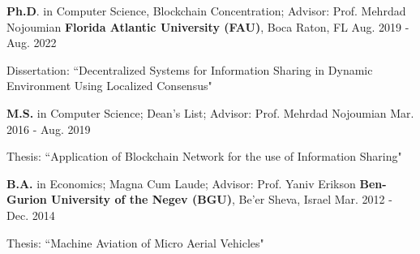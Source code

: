 


\begin{cventries}


\cventry
{\textbf{Ph.D}. in Computer Science, Blockchain Concentration; Advisor: Prof. Mehrdad Nojoumian} %
{\textbf{Florida Atlantic University (FAU)}, Boca Raton, FL} %
{} %
{Aug. 2019 - Aug. 2022} %
{ %
	\begin{cvitems}
		\item {Dissertation: ``Decentralized Systems for Information Sharing in Dynamic Environment Using Localized Consensus"}
	\end{cvitems}
}

\cventry
{\textbf{M.S.} in Computer Science; Dean's List; Advisor: Prof. Mehrdad Nojoumian} %
{} %
{} %
{Mar. 2016 - Aug. 2019} %
{ %
	\begin{cvitems}
		\item {Thesis: ``Application of Blockchain Network for the use of Information Sharing"}
	\end{cvitems}
}


\cventry
{\textbf{B.A.} in Economics; Magna Cum Laude; Advisor: Prof. Yaniv Erikson} %
{\textbf{Ben-Gurion University of the Negev (BGU)}, Be'er Sheva, Israel} %
{} %
{Mar. 2012 - Dec. 2014} %
{ %
\begin{cvitems}
\item {Thesis: ``Machine Aviation of Micro Aerial Vehicles"}
\end{cvitems}
}


\end{cventries}